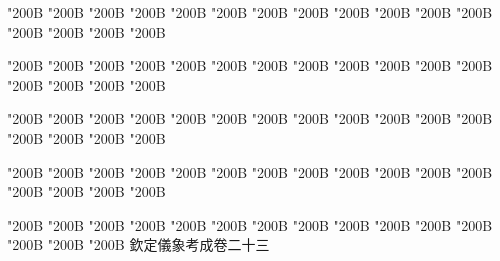 \begin{正文}
\char"200B\relax{}
\char"200B\relax{}
\char"200B\relax{}
\char"200B\relax{}
\char"200B\relax{}
\char"200B\relax{}
\char"200B\relax{}
\char"200B\relax{}
\char"200B\relax{}
\char"200B\relax{}
\char"200B\relax{}
\char"200B\relax{}
\char"200B\relax{}
\char"200B\relax{}
\char"200B\relax{}
\char"200B\relax
{}\par
\end{正文}\clearpage
{}
\begin{正文}
\char"200B\relax{}
\char"200B\relax{}
\char"200B\relax{}
\char"200B\relax{}
\char"200B\relax{}
\char"200B\relax{}
\char"200B\relax{}
\char"200B\relax{}
\char"200B\relax{}
\char"200B\relax{}
\char"200B\relax{}
\char"200B\relax{}
\char"200B\relax{}
\char"200B\relax{}
\char"200B\relax{}
\char"200B\relax
{}\par
\end{正文}\clearpage
{}
\begin{正文}
\char"200B\relax{}
\char"200B\relax{}
\char"200B\relax{}
\char"200B\relax{}
\char"200B\relax{}
\char"200B\relax{}
\char"200B\relax{}
\char"200B\relax{}
\char"200B\relax{}
\char"200B\relax{}
\char"200B\relax{}
\char"200B\relax{}
\char"200B\relax{}
\char"200B\relax{}
\char"200B\relax{}
\char"200B\relax
{}\par
\end{正文}\clearpage
{}
\begin{正文}
\char"200B\relax{}
\char"200B\relax{}
\char"200B\relax{}
\char"200B\relax{}
\char"200B\relax{}
\char"200B\relax{}
\char"200B\relax{}
\char"200B\relax{}
\char"200B\relax{}
\char"200B\relax{}
\char"200B\relax{}
\char"200B\relax{}
\char"200B\relax{}
\char"200B\relax{}
\char"200B\relax{}
\char"200B\relax
{}\par
\end{正文}\clearpage
{}
\begin{正文}
\char"200B\relax{}
\char"200B\relax{}
\char"200B\relax{}
\char"200B\relax{}
\char"200B\relax{}
\char"200B\relax{}
\char"200B\relax{}
\char"200B\relax{}
\char"200B\relax{}
\char"200B\relax{}
\char"200B\relax{}
\char"200B\relax{}
\char"200B\relax{}
\char"200B\relax{}
\char"200B\relax{}
欽定儀象考成卷二十三
\par

\par\end{正文}\clearpage
